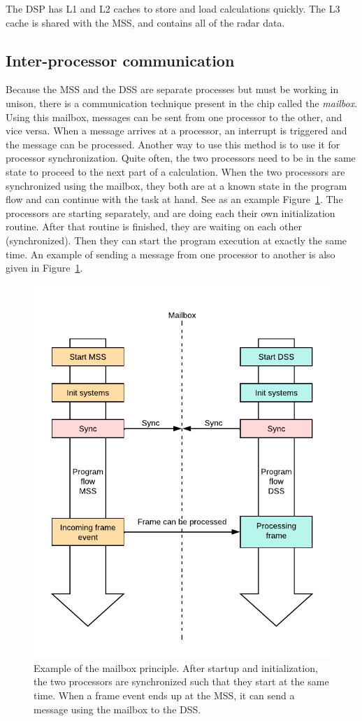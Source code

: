 The DSP has L1 and L2 caches to store and load calculations quickly. The L3 cache is shared with the MSS, and contains all of the radar data. 

\subsection{Inter-processor communication}
Because the MSS and the DSS are separate processes but must be working in unison, there is a communication technique present in the chip called the \emph{mailbox}. Using this mailbox, messages can be sent from one processor to the other, and vice versa. When a message arrives at a processor, an interrupt is triggered and the message can be processed. Another way to use this method is to use it for processor synchronization. Quite often, the two processors need to be in the same state to proceed to the next part of a calculation. When the two processors are synchronized using the mailbox, they both are at a known state in the program flow and can continue with the task at hand. See as an example Figure~\ref{fig:mailbox_principle}. The processors are starting separately, and are doing each their own initialization routine. After that routine is finished, they are waiting on each other (synchronized). Then they can start the program execution at exactly the same time. An example of sending a message from one processor to another is also given in Figure~\ref{fig:mailbox_principle}.

\begin{figure}[t]
\centering
\includegraphics[width=.6\textwidth]{figures/realtime_implementation/Mailbox working principle.pdf}
\caption{Example of the mailbox principle. After startup and initialization, the two processors are synchronized such that they start at the same time. When a frame event ends up at the MSS, it can send a message using the mailbox to the DSS.}
\label{fig:mailbox_principle}
\end{figure}

